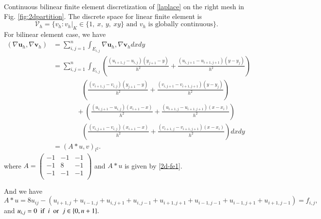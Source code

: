 

Continuous bilinear finite element discretization of
\eqref{laplace} on the right mesh in 
Fig. \ref{fig:2dpartition}. The discrete space for linear finite element is 
$$
\mathcal V_h=\{v_h: v_h|_K\in \{1,\ x,\ y,\ xy \} \text{ and } v_h \text{ is globally continuous}\}.
$$ 
For bilinear element case, we have 
\begin{equation}
\begin{split}
(\nabla \mathbf u_h, \nabla \mathbf v_h)&=\sum\limits_{i,j=1}^{n}\int_{E_{i,j}}\nabla \mathbf u_h, \nabla \mathbf v_h dxdy\\
&=\sum\limits_{i,j=1}^{n}\int_{E_{i,j}} \left(\frac{(u_{i+1,j}-u_{i,j})(y_{j+1}-y)}{h^2}
+\frac{(u_{i,j+1}-u_{i+1,j+1})(y-y_j)}{h^2}\right)\\
&~\qquad\qquad\left(\frac{(v_{i+1,j}-v_{i,j})(y_{j+1}-y)}{h^2}
+\frac{(v_{i,j+1}-v_{i+1,j+1})(y-y_j)}{h^2}\right)\\
&~~\quad\qquad+\left(\frac{(u_{i,j+1}-u_{i,j})(x_{i+1}-x)}{h^2}
+\frac{(u_{i+1,j}-u_{i+1,j+1})(x-x_i)}{h^2}\right)\\
&~\qquad\qquad \left(\frac{(v_{i,j+1}-v_{i,j})(x_{i+1}-x)}{h^2}
+\frac{(v_{i+1,j}-v_{i+1,j+1})(x-x_i)}{h^2}\right)dxdy\\
&=(A\ast u, v)_{l^2}.
\end{split}
\end{equation}
where $A=\left(
\begin{matrix}
-1&-1&-1\\
-1&8&-1\\
-1&-1&-1\\
\end{matrix}
\right)$ 
and $A\ast u$ is given by \eqref{2d-fe1}.

And we have
\begin{equation}
  \label{2d-fe1}
A\ast u=8u_{ij}-(u_{i+1,j}+u_{i-1,j}+u_{i,j+1}+u_{i,j-1}+u_{i+1,j+1}+u_{i-1,j-1}+u_{i-1,j+1}+u_{i+1,j-1})=f_{i,j},
\end{equation}
and 
$
u_{i,j}=0~~\hbox{if}~~i ~~\hbox{or}~~ j\in \{0, n+1\}.
$

